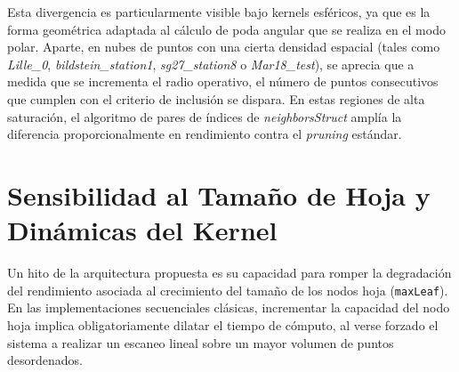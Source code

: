 Esta divergencia es particularmente visible bajo kernels esféricos, ya que es la forma geométrica adaptada al cálculo de poda angular que se realiza en el modo polar. Aparte, en nubes de puntos con una cierta densidad espacial (tales como \textit{Lille\_0}, \textit{bildstein\_station1}, \textit{sg27\_station8} o \textit{Mar18\_test}), se aprecia que a medida que se incrementa el radio operativo, el número de puntos consecutivos que cumplen con el criterio de inclusión se dispara. En estas regiones de alta saturación, el algoritmo de pares de índices de \textit{neighborsStruct} amplía la diferencia proporcionalmente en rendimiento contra el \textit{pruning} estándar.

\section{Sensibilidad al Tamaño de Hoja y Dinámicas del Kernel}

Un hito de la arquitectura propuesta es su capacidad para romper la degradación del rendimiento asociada al crecimiento del tamaño de los nodos hoja (\texttt{maxLeaf}). En las implementaciones secuenciales clásicas, incrementar la capacidad del nodo hoja implica obligatoriamente dilatar el tiempo de cómputo, al verse forzado el sistema a realizar un escaneo lineal sobre un mayor volumen de puntos desordenados.

